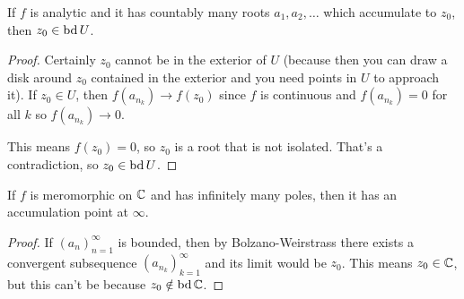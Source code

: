 \begin{theorem}
    If $f$ is analytic and it has countably many roots 
    $a_1, a_2, \ldots$ which accumulate to $z_0$, then 
    $z_0 \in \operatorname{bd} U$.
\end{theorem}

\begin{proof}
    Certainly $z_0$ cannot be in the exterior of $U$ (because then
    you can draw a disk around $z_0$ contained in the exterior
    and you need points in $U$ to approach it).
    If $z_0 \in U$, then $f(a_{n_k}) \to f(z_0)$ since $f$ is
    continuous and $f(a_{n_k}) = 0$ for all $k$ so $f(a_{n_k})
    \to 0$.

    This means $f(z_0) = 0$, 
    so $z_0$ is a root that is not isolated.
    That's a contradiction, so $z_0 \in \operatorname{bd} U$.
\end{proof}


\begin{theorem}
    If $f$ is meromorphic on $\operatorname{\mathbb{C}}$ and has infinitely many
    poles, then it has an accumulation point at $\infty$.
\end{theorem}

\begin{proof}
    If $(a_n)_{n=1}^{\infty}$ is bounded, then by
    Bolzano-Weirstrass there exists a convergent subsequence
    $(a_{n_k})_{k=1}^{\infty}$ and its limit would be $z_0$.
    This means $z_0 \in \operatorname{\mathbb{C}}$, but this can't be because
    $z_0 \notin \operatorname{bd} \operatorname{\mathbb{C}}$.
\end{proof}







